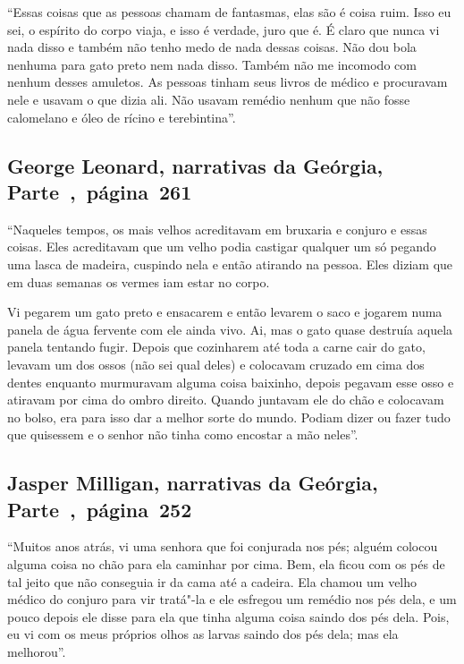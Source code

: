 ``Essas coisas que as pessoas chamam de fantasmas, elas são é coisa
ruim. Isso eu sei, o espírito do corpo viaja, e isso é verdade, juro que
é. É claro que nunca vi nada disso e também não tenho medo de nada
dessas coisas. Não dou bola nenhuma para gato preto nem nada disso.
Também não me incomodo com nenhum desses amuletos. As pessoas tinham
seus livros de médico e procuravam nele e usavam o que dizia ali. Não
usavam remédio nenhum que não fosse calomelano e óleo de rícino e
terebintina''.

\subsection{George Leonard, narrativas da Geórgia, Parte~,~página~261}
\label{ref169}

``Naqueles tempos, os mais velhos acreditavam em bruxaria e conjuro e
essas coisas. Eles acreditavam que um velho podia castigar qualquer um
só pegando uma lasca de madeira, cuspindo nela e então atirando na
pessoa. Eles diziam que em duas semanas os vermes iam estar no corpo.

Vi pegarem um gato preto e ensacarem e então levarem o saco e jogarem
numa panela de água fervente com ele ainda vivo. Ai, mas o gato quase
destruía aquela panela tentando fugir. Depois que cozinharem até toda a
carne cair do gato, levavam um dos ossos (não sei qual deles) e
colocavam cruzado em cima dos dentes enquanto murmuravam alguma coisa
baixinho, depois pegavam esse osso e atiravam por cima do ombro direito.
Quando juntavam ele do chão e colocavam no bolso, era para isso dar a
melhor sorte do mundo. Podiam dizer ou fazer tudo que quisessem e o
senhor não tinha como encostar a mão neles''.

\subsection{Jasper Milligan, narrativas da Geórgia, Parte~,~página~252}
\label{ref193}

``Muitos anos atrás, vi uma senhora que foi conjurada nos pés; alguém
colocou alguma coisa no chão para ela caminhar por cima. Bem, ela ficou
com os pés de tal jeito que não conseguia ir da cama até a cadeira. Ela
chamou um velho médico do conjuro para vir tratá"-la e ele esfregou um
remédio nos pés dela, e um pouco depois ele disse para ela que tinha
alguma coisa saindo dos pés dela. Pois, eu vi com os meus próprios olhos
as larvas saindo dos pés dela; mas ela melhorou''.

